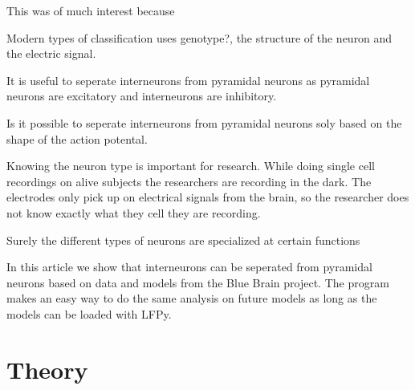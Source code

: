 \documentclass[altfont, fleqn]{uiophd}
\begin{document}
This was of much interest because 


Modern types of 
classification uses genotype?, the structure of the neuron and the 
electric signal.

It is useful to seperate interneurons from pyramidal neurons as
pyramidal neurons are excitatory and interneurons are inhibitory. 

Is it possible to seperate interneurons from pyramidal neurons soly
based on the shape of the action potental. 

Knowing the neuron type is important for research. 
While doing single cell recordings on alive subjects the researchers are
recording in the dark. 
The electrodes only pick up on electrical signals from the brain, 
so the researcher does not know exactly what they cell they are recording. 

Surely the different types of neurons are specialized at certain functions

In this article we show that interneurons can be seperated from pyramidal
neurons based on data and models from the Blue Brain project. 
The program makes an easy way to do the same analysis
on future models as long as the models can be loaded with LFPy.


\chapter{Theory}

\vspace{1em} 
\startcontents
{}
  
\end{document}
